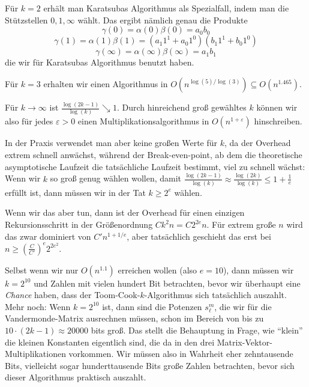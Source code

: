 \begin{remark}
    Für $k=2$ erhält man Karatsubas Algorithmus als Spezialfall, indem man die Stützstellen $0,1,\infty$ wählt. Das ergibt nämlich genau die Produkte
    \[\gamma(0) = \alpha(0)\beta(0) = a_0 b_0\]
    \[\gamma(1) = \alpha(1)\beta(1) = (a_1 1^1+a_0 1^0)(b_1 1^1+b_0 1^0)\]
    \[\gamma(\infty) = \alpha(\infty)\beta(\infty) = a_1 b_1\]
    die wir für Karatsubas Algorithmus benutzt haben.
\end{remark}

\begin{remark}
    Für $k=3$ erhalten wir einen Algorithmus in $O(n^{\log(5)/\log(3)}) \subseteq O(n^{1.465})$.
\end{remark}

\begin{remark}[Große $k$]
    Für $k\to\infty$ ist $\frac{\log(2k-1)}{\log(k)} \searrow 1$. Durch hinreichend groß gewähltes $k$ können wir also für jedes $\varepsilon>0$ einen Multiplikationsalgorithmus in $O(n^{1+\varepsilon})$ hinschreiben.

    \medskip
    In der Praxis verwendet man aber keine großen Werte für $k$, da der Overhead extrem schnell anwächst, während der Break-even-point, ab dem die theoretische asymptotische Laufzeit die tatsächliche Laufzeit bestimmt, viel zu schnell wächst: Wenn wir $k$ so groß genug wählen wollen, damit $\frac{\log(2k-1)}{\log(k)} \approx \frac{\log(2k)}{\log(k)} \leq 1+\frac{1}{e}$ erfüllt ist, dann müssen wir in der Tat $k\geq 2^e$ wählen.

    Wenn wir das aber tun, dann ist der Overhead für einen einzigen Rekursionsschritt in der Größenordnung $C k^2 n = C 2^{2e}n$. Für extrem große $n$ wird das zwar dominiert von $C' n^{1+1/e}$, aber tatsächlich geschieht das erst bei $n\geq \left(\frac{C}{C'}\right)^e 2^{2 e^2}$.

    \smallskip
    Selbst wenn wir nur $O(n^{1.1})$ erreichen wollen (also $e=10$), dann müssen wir $k=2^{10}$ und Zahlen mit vielen hundert Bit betrachten, bevor wir überhaupt eine \emph{Chance} haben, dass der Toom-Cook-$k$-Algorithmus sich tatsächlich auszahlt. Mehr noch: Wenn $k=2^{10}$ ist, dann sind die Potenzen $s_\ell^m$, die wir für die Vandermonde-Matrix ausrechnen müssen, schon im Bereich von bis zu $10 \cdot (2k-1) \approx 20000$ bits groß. Das stellt die Behauptung in Frage, wie \enquote{klein} die kleinen Konstanten eigentlich sind, die da in den drei Matrix-Vektor-Multiplikationen vorkommen. Wir müssen also in Wahrheit eher zehntausende Bits, vielleicht sogar hunderttausende Bits große Zahlen betrachten, bevor sich dieser Algorithmus praktisch auszahlt.
\end{remark}


